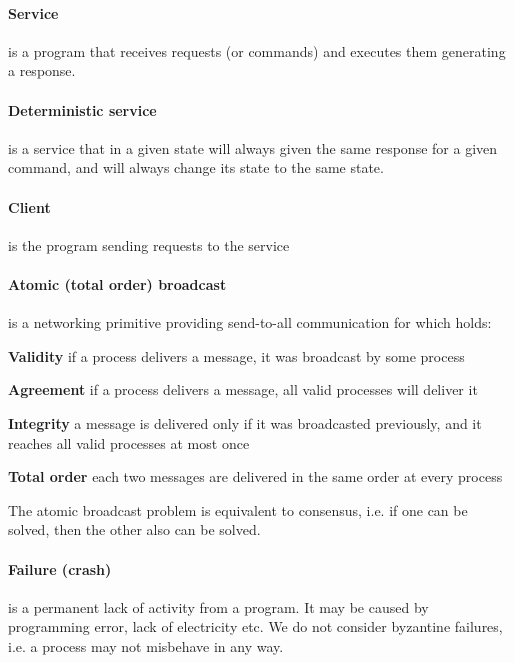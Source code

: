 \paragraph{Service}
is a program that receives requests (or commands) and executes them generating a response.

\paragraph{Deterministic service}
is a service that in a given state will always given the same response for a given command, and will always change its state to the same state.

\paragraph{Client}
is the program sending requests to the service

\paragraph{Atomic (total order) broadcast}
is a networking primitive providing send-to-all communication for which holds:
\begin{tightList}[\setlength{\leftmargin}{2\leftmargin}]
 \item[\textbf{Validity}] if a process delivers a message, it was broadcast by some process
 \item[\textbf{Agreement}] if a process delivers a message, all valid processes will deliver it
 \item[\textbf{Integrity}] a message is delivered only if it was broadcasted previously, and it reaches all valid processes at most once
 \item[\textbf{Total order}] each two messages are delivered in the same order at every process
\end{tightList}

\noindent The atomic broadcast problem is equivalent to consensus, i.e. if one can be solved, then the other also can be solved.

\paragraph{Failure (crash)}
is a permanent lack of activity from a program. It may be caused by programming error, lack of electricity etc.
We do not consider byzantine failures, i.e. a process may not misbehave in any way.

